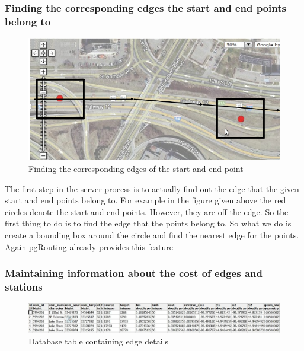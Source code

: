 \documentclass[a4paper,12pt, notitlepage, oneside, onecolumn]{article}
\begin{document}
\subsubsection{Finding the corresponding edges the start and end points belong to}
\begin{figure}[H]
\begin{minipage}[b]{1.0\linewidth}
\centering
\includegraphics[scale=0.6]{start_end_edge.png}
\caption{Finding the corresponding edges of the start and end point}
\label{fig:start_end_edge}
\end{minipage}
\centering
\end{figure}

The first step in the server process is to actually find out the edge that the given start and end points belong to. For example in the figure given above the red circles denote the start and end points. However, they are off the edge. So the first thing to do is to find the edge that the points belong to. So what we do is create a bounding box around the circle and find the nearest edge for the points. Again pgRouting already provides this feature \cite{pgrouting_findedges}


\subsubsection{Maintaining information about the cost of edges and stations}

\begin{figure}[H]
\begin{minipage}[b]{1.0\linewidth}
\centering
\includegraphics[scale=0.35]{edge_cost_information.jpg}
\caption{Database table containing edge details}
\label{fig:edge_cost_information}
\end{minipage}
\centering
\end{figure}
\end{document}
